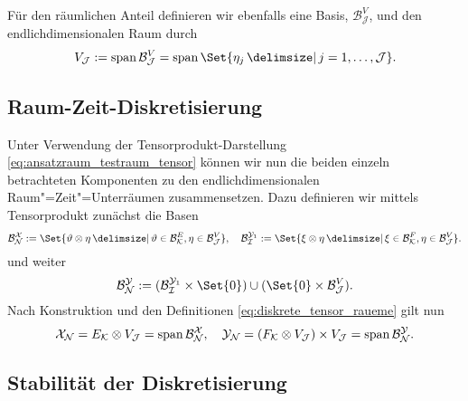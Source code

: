 \documentclass[../main.tex]{subfiles}
\begin{document}
Für den räumlichen Anteil definieren wir ebenfalls eine Basis, $\mathcal B^{V}_{\mathcal J}$, und den endlichdimensionalen Raum durch
\begin{equation}
    \label{eq:raeumlicher_anteil}
    V_{\mathcal J} := \spn \mathcal B^{V}_{\mathcal J} = \spn \Set{ \eta_{j} \given j = 1, \dots, \mathcal J}.
\end{equation}


\subsection*{Raum-Zeit-Diskretisierung} %

Unter Verwendung der Tensorprodukt-Darstellung \cref{eq:ansatzraum_testraum_tensor} können wir nun die beiden einzeln betrachteten Komponenten zu den endlichdimensionalen Raum"=Zeit"=Unterräumen zusammensetzen.
Dazu definieren wir mittels Tensorprodukt zunächst die Basen
\begin{equation}
\label{eq:diskreter_ansatzraum_basis_phi}
\label{eq:diskreter_testraum_basis_psi1}
    \mathcal B^{\mathcal X}_{\mathcal N} := \Set{\theta \otimes \eta \given \theta \in \mathcal B^{E}_{\mathcal K}, \eta \in \mathcal B^{V}_{\mathcal J}}, \quad
    \mathcal B^{\mathcal Y_{1}}_{\mathcal I} := \Set{\xi \otimes \eta \given \xi \in \mathcal B^{F}_{\mathcal K}, \eta \in \mathcal B^{V}_{\mathcal J}}.
\end{equation}
und weiter
\begin{equation}
\label{eq:diskreter_testraum_basis_psi}
    \mathcal B^{\mathcal Y}_{\mathcal N} := (\mathcal B^{\mathcal Y_{1}}_{\mathcal I} \times \Set{ 0 }) \cup (\Set{0} \times \mathcal B^{V}_{\mathcal J}).
\end{equation}
Nach Konstruktion und den Definitionen \cref{eq:diskrete_tensor_raueme} gilt nun
\begin{equation}
    \label{eq:diskreter_ansatz_und_testraum_als_span}
    \mathcal X_{\mathcal N} = E_{\mathcal K} \otimes V_{\mathcal J} = \operatorname{span} \mathcal B^{\mathcal X}_{\mathcal N},
    \quad
    \mathcal Y_{\mathcal N} = (F_{\mathcal K} \otimes V_{\mathcal J}) \times V_{\mathcal J} = \operatorname{span} \mathcal B^{\mathcal Y}_{\mathcal N}.
\end{equation}

\subsection*{Stabilität der Diskretisierung} %
\end{document}
